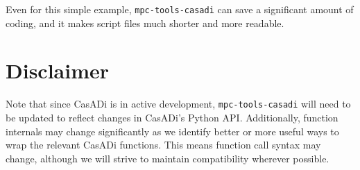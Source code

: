 \documentclass{article}
\newcommand{\casadi}{CasADi}
\begin{document}
Even for this simple example, \texttt{mpc-tools-casadi} can save a significant amount of coding, and it makes script files much shorter and more readable.

\section{Disclaimer}

Note that since \casadi{} is in active development, \texttt{mpc-tools-casadi} will need to be updated to reflect changes in \casadi{}'s Python API.
Additionally, function internals may change significantly as we identify better or more useful ways to wrap the relevant \casadi{} functions.
This means function call syntax may change, although we will strive to maintain compatibility wherever possible.
\end{document}
